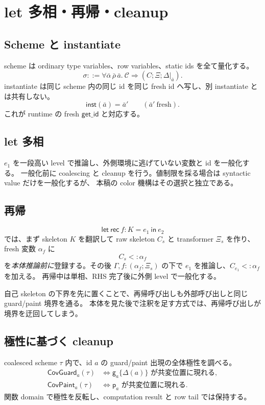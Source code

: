 \documentclass[uplatex,dvipdfmx,a4paper,11pt]{jsarticle}
\theoremstyle{jpplain}
\newcommand{\subty}{\mathrel{<:}}
\newcommand{\gatom}[2]{\mathsf g_{#1}\!\{#2\}}
\newcommand{\patom}[1]{\mathsf p_{#1}}
\newcommand{\inst}{\mathsf{inst}}
\newcommand{\CovG}{\mathsf{CovGuard}}
\newcommand{\CovP}{\mathsf{CovPaint}}
\newcommand{\getid}{\mathsf{get\_id}}
\begin{document}
\section{let 多相・再帰・cleanup}

\subsection{Scheme と instantiate}

scheme は ordinary type variables、row variables、static ids を全て量化する。
\[
  \sigma ::= \forall\bar\alpha\,\bar\rho\,\bar a.\ \mathcal C\Rightarrow(C;\Xi;\Delta|_{\bar a}).
\]
instantiate は同じ scheme 内の同じ id を同じ fresh id へ写し、別 instantiate とは共有しない。
\[
  \inst(\bar a)=\bar a'\qquad(\bar a'\ \text{fresh}).
\]
これが runtime の fresh $\getid$ と対応する。

\subsection{let 多相}

$e_1$ を一段高い level で推論し、外側環境に逃げていない変数と id を一般化する。
一般化前に coalescing と cleanup を行う。値制限を採る場合は syntactic value だけを一般化するが、
本稿の color 機構はその選択と独立である。

\subsection{再帰}

\[
 \mathsf{let\ rec}\ f:K=e_1\ \mathsf{in}\ e_2
\]
では、まず skeleton $K$ を翻訳して raw skeleton $C_s$ と transformer $\Xi_s$ を作り、fresh 変数 $\alpha_f$ に
\[
  C_s\subty\alpha_f
\]
を\emph{本体推論前に}登録する。その後
$\Gamma,f:(\alpha_f;\Xi_s)$ の下で $e_1$ を推論し、$C_{e_1}\subty\alpha_f$ を加える。
再帰中は単相、RHS 完了後に外側 level で一般化する。

\begin{intuition}
自己 skeleton の下界を先に置くことで、再帰呼び出しも外部呼び出しと同じ guard/paint 境界を通る。
本体を見た後で注釈を足す方式では、再帰呼び出しが境界を迂回してしまう。
\end{intuition}

\subsection{極性に基づく cleanup}

coalesced scheme $\tau$ 内で、id $a$ の guard/paint 出現の全体極性を調べる。
\[
\begin{aligned}
 \CovG_a(\tau)&\iff \text{$\gatom a{\Delta(a)}$ が共変位置に現れる},\\
 \CovP_a(\tau)&\iff \text{$\patom a$ が共変位置に現れる}.
\end{aligned}
\]
関数 domain で極性を反転し、computation result と row tail では保持する。
\end{document}
